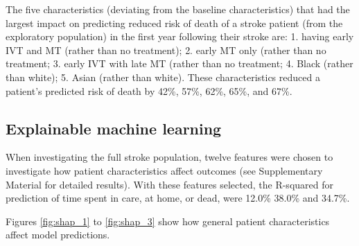 The five characteristics (deviating from the baseline characteristics) that had the largest impact on predicting reduced risk of death of a stroke patient (from the exploratory population) in the first year following their stroke are: 1. having early IVT and MT (rather than no treatment); 2. early MT only (rather than no treatment; 3. early IVT with late MT (rather than no treatment; 4. Black (rather than white); 5. Asian (rather than white). These characteristics reduced a patient's predicted risk of death by 42\%, 57\%, 62\%, 65\%, and 67\%.


\subsection{Explainable machine learning}

When investigating the full stroke population, twelve features were chosen to investigate how patient characteristics affect outcomes (see Supplementary Material for detailed results). With these features selected, the R-squared for prediction of time spent in care, at home, or dead, were  12.0\% 38.0\% and 34.7\%. 

Figures \ref{fig:shap_1} to \ref{fig:shap_3} show how general patient characteristics affect model predictions. 


